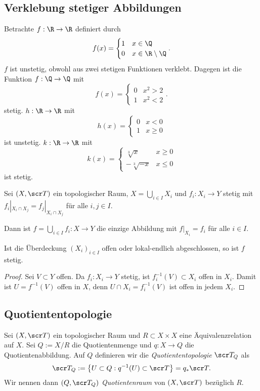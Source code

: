 \subsection{Verklebung stetiger Abbildungen}

Betrachte $f: \R \to \R$ definiert durch
\[
	f(x) = \begin{cases}
		1 & x \in \Q \\
		0 & x \in \R \setminus \Q
	\end{cases}.
\]
$f$ ist unstetig, obwohl aus zwei stetigen Funktionen verklebt.
Dagegen ist die Funktion $f: \Q \to \Q$ mit
\[
	f(x) = \begin{cases}
		0 & x^2 > 2 \\
		1 & x^2 < 2
	\end{cases}.
\]
stetig.
$h : \R \to \R$ mit
\[
	h(x) = \begin{cases}
		0 & x < 0 \\
		1 & x \ge 0
	\end{cases}
\]
ist unstetig.
$k : \R \to \R$ mit
\[
	k(x) = \begin{cases}
		\sqrt[3]{x} & x \ge 0 \\
		-\sqrt[3]{-x} & x \le 0
	\end{cases}
\]
ist stetig.

\begin{st}
	Sei $(X, \scr T)$ ein topologischer Raum, $X = \bigcup_{i \in I} X_i$ und $f_i: X_i \to Y$ stetig mit $f_i|_{X_i \cap X_j} = f_j|_{X_i \cap X_j}$ für alle $i,j \in I$.

	Dann ist $f = \bigcup_{i \in I} f_i : X \to Y$ die einzige Abbildung mit $f|_{X_i} = f_i$ für alle $i \in I$.

	Ist die Überdeckung $(X_i)_{i\in I}$ offen oder lokal-endlich abgeschlossen, so ist $f$ stetig.
	\begin{proof}
		Sei $V \subset Y$ offen.
		Da $f_i : X_i \to Y$ stetig, ist $f_i^{-1}(V) \subset X_i$ offen in $X_i$.
		Damit ist $U = f^{-1}(V)$ offen in $X$, denn $U \cap X_i = f_i^{-1}(V)$ ist offen in jedem $X_i$.
	\end{proof}
\end{st}

\subsection{Quotiententopologie}

\begin{df}
	Sei $(X, \scr T)$ ein topologischer Raum und $R \subset X \times X$ eine Äquivalenzrelation auf $X$.
	Sei $Q := X / R$ die Quotientenmenge und $q: X \to Q$ die Quotientenabbildung.
	Auf $Q$ definieren wir die \emph{Quotiententopologie} $\scr T_Q$ als
	\[
		\scr T_Q
		:= \big\{ U \subset Q : q^{-1}(U) \subset \scr T \big\}
		= q_* \scr T.
	\]
	Wir nennen dann $(Q, \scr T_Q)$ \emph{Quotientenraum} von $(X, \scr T)$ bezüglich $R$.
\end{df}

